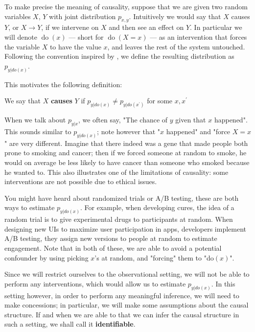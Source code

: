 To make precise the meaning of causality, suppose that we are given 
two random variables $X$, $Y$ with joint distribution $p_{x, y}$. Intuitively we 
would say that $X$ causes $Y$, or $X \rightarrow Y$, if we intervene on $X$ and then see an effect on $Y$. In particular
we will denote $\operatorname{do}(x)$ --- short for $\operatorname{do}(X = x)$ --- as an intervention
that forces the variable $X$ to have the value $x$, and leaves the rest of the system untouched. 
Following the convention inspired by \cite{pearl2000causality}, 
we define the resulting distribution as $p_{y|do(x)}$.

This motivates the following definition:

\begin{definition}
    We say that $X$ \textbf{causes} $Y$ if $p_{y|do(x)} \neq p_{y|do(x^\prime)}$ for some
    $x, x^\prime$
\end{definition}

When we talk about $p_{y|x}$, we often say, "The chance of $y$ given that $x$ happened". This sounds similar
to $p_{y|do(x)}$; note however that "$x$ happened" and "force $X = x$" are very different. Imagine that 
there indeed was a gene that made people both prone to smoking and cancer; then if we forced someone at 
random to smoke, he would on average be less likely to have cancer than someone who smoked because he wanted to.
This also illustrates 
one of the limitations of causality: some interventions are not possible due to ethical issues.

You might have heard about randomized trials or A/B testing, these are both ways to estimate $p_{y|do(x)}$.
For example, when developing cures, the idea of a random trial is to give experimental drugs to participants
at random. When designing new UIs to maximize user participation in apps, developers implement A/B testing, 
they assign new versions to people at random to estimate engagement. Note that in both of these, we are able 
to avoid a potential confounder by using picking $x$'s at random, and "forcing" them to "do$(x)$".

Since we will restrict ourselves to the observational setting, we will not be able to perform any interventions,
which would allow us to estimate $p_{y|do(x)}$. In this setting however, in order to perform any meaningful
inference, we will need to make concessions; in particular, we will make some assumptions about 
the causal structure. If and when we are able to that we can infer the causal structure in such a setting, we 
shall call it \textbf{identifiable}.

